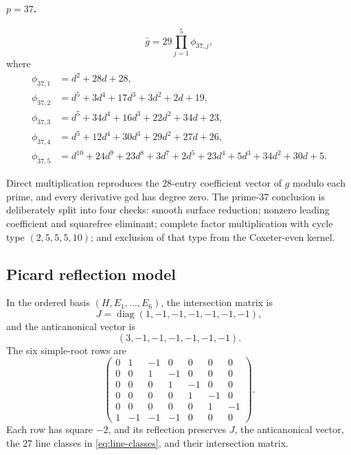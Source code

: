 \paragraph{\(p=37\).}
\[
 \bar g=29\prod_{j=1}^{5}\phi_{37,j},
\]
where
\begin{align*}
\phi_{37,1}&=d^2+28d+28,\\
\phi_{37,2}&=d^5+3d^4+17d^3+3d^2+2d+19,\\
\phi_{37,3}&=d^5+34d^4+16d^3+22d^2+34d+23,\\
\phi_{37,4}&=d^5+12d^4+30d^3+29d^2+27d+26,\\
\phi_{37,5}&=d^{10}+24d^9+23d^8+3d^7+2d^5
 +23d^4+5d^3+34d^2+30d+5.
\end{align*}

Direct multiplication reproduces the \(28\)-entry coefficient vector of
\(g\) modulo each prime, and every derivative gcd has degree zero.  The
prime-\(37\) conclusion is deliberately split into four checks: smooth
surface reduction; nonzero leading coefficient and squarefree eliminant;
complete factor multiplication with cycle type
\((2,5,5,5,10)\); and exclusion of that type from the Coxeter-even kernel.

\subsection{Picard reflection model}

In the ordered basis \((H,E_1,\ldots,E_6)\), the intersection matrix is
\[
 J=\operatorname{diag}(1,-1,-1,-1,-1,-1,-1),
\]
and the anticanonical vector is
\[
 (3,-1,-1,-1,-1,-1,-1).
\]
The six simple-root rows are
\[
\begin{pmatrix}
0&1&-1&0&0&0&0\\
0&0&1&-1&0&0&0\\
0&0&0&1&-1&0&0\\
0&0&0&0&1&-1&0\\
0&0&0&0&0&1&-1\\
1&-1&-1&-1&0&0&0
\end{pmatrix}.
\]
Each row has square \(-2\), and its reflection preserves \(J\), the
anticanonical vector, the \(27\) line classes in
\cref{eq:line-classes}, and their intersection matrix.

